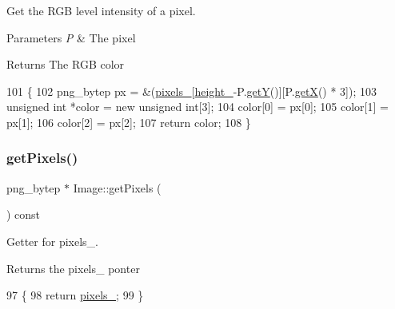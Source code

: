 Get the R\+GB level intensity of a pixel. 


\begin{DoxyParams}{Parameters}
{\em P} & The pixel \\
\hline
\end{DoxyParams}
\begin{DoxyReturn}{Returns}
The R\+GB color 
\end{DoxyReturn}

\begin{DoxyCode}
101                                           \{
102     png\_bytep px = \&(\mbox{\hyperlink{class_image_a51351c8507499d09cb9667c20ef01faf}{pixels\_}}[\mbox{\hyperlink{class_image_a64a699c5bb8e8a18c6971a8032806dba}{height\_}}-P.\mbox{\hyperlink{class_point_a86d10ff46e08462c45b15a8c7ef62d61}{getY}}()][P.\mbox{\hyperlink{class_point_ac9d5859db121c7d1b89ca89266dca0a3}{getX}}() * 3]);
103     \textcolor{keywordtype}{unsigned} \textcolor{keywordtype}{int} *color = \textcolor{keyword}{new} \textcolor{keywordtype}{unsigned} \textcolor{keywordtype}{int}[3];
104     color[0] = px[0];
105     color[1] = px[1];
106     color[2] = px[2];
107     \textcolor{keywordflow}{return} color;
108 \}
\end{DoxyCode}
\mbox{\label{class_image_a434149170df3e6fad24cc123c8ff029d}} 
\subsubsection{\texorpdfstring{get\+Pixels()}{getPixels()}}
{\footnotesize\ttfamily png\+\_\+bytep $\ast$ Image\+::get\+Pixels (\begin{DoxyParamCaption}{ }\end{DoxyParamCaption}) const}



Getter for pixels\+\_\+. 

\begin{DoxyReturn}{Returns}
the pixels\+\_\+ ponter 
\end{DoxyReturn}

\begin{DoxyCode}
97                                   \{
98     \textcolor{keywordflow}{return} \mbox{\hyperlink{class_image_a51351c8507499d09cb9667c20ef01faf}{pixels\_}};
99 \}
\end{DoxyCode}
\mbox{\label{class_image_ac34bdffd357a50025e6a72deb02596b5}} 
